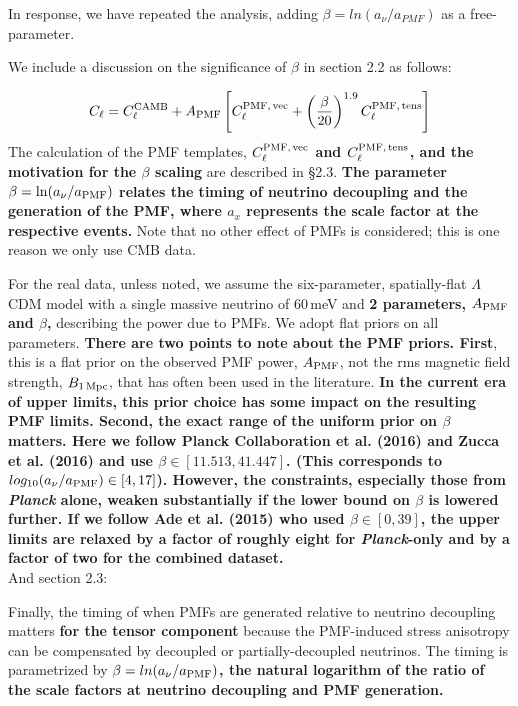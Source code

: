 \documentclass{article}
\newcommand{\cpmftens}{\ensuremath{C_{\ell}^{\rm PMF,\,tens}}}
\newcommand{\cpmfvec}{\ensuremath{C_{\ell}^{\rm PMF,\,vec}}}
\newcommand{\apmf}{\ensuremath{A_{\rm PMF}}}
\newcommand{\bpmf}{\ensuremath{B_{\rm 1\,Mpc}}}
\newcommand{\lcdm}{\ensuremath{\Lambda}CDM}
\newcommand{\be}{\begin{equation}}
\newcommand{\ee}{\end{equation}}
\newcommand{\planck}{{\sl Planck}}
\newcommand{\added}[1]{\textbf{#1}}
\newcommand{\diff}[1]{\textcolor{PineGreen}{#1}}
\begin{document}
In response, we have repeated the analysis, adding $\beta = ln(a_{\nu}/a_{PMF})$ as a free-parameter.

We include a discussion on the significance of $\beta$ in section 2.2 as follows:

\diff{
\be
C_\ell = C_\ell^{\rm{CAMB}} + \apmf \left[\cpmfvec + \left(\frac{\beta}{20}\right)^{1.9}  \cpmftens \right]
\ee
The calculation of the PMF templates,\added{ \cpmfvec{} and \cpmftens{}, and the motivation for the $\beta$ scaling} are described in \S 2.3. 
\added{The parameter $\beta = {\rm ln}(a_{\nu}/a_{\rm{PMF}})$ relates the timing of neutrino decoupling and the generation of the PMF, where $a_x$ represents the scale factor at the respective events.} Note that no other effect of  PMFs is considered; this is one reason we only use CMB data.}

\diff{For the real data, unless noted, we assume the six-parameter, spatially-flat \lcdm{} model with a single massive neutrino of 60\,meV and \added{2 parameters, \apmf{} and $\beta$, }describing the power due to PMFs.
We adopt flat priors on all parameters. 
\added{There are two points to note about the PMF priors. 
First}, this is a flat prior on the observed PMF power, $\apmf$, not the rms magnetic field strength, \bpmf, that has often been used in the literature. 
\added{In the current era of upper limits, this prior choice has some impact on the resulting PMF limits. 
Second, the exact range of the uniform prior on $\beta$ matters. 
Here we follow Planck Collaboration et al. (2016) and Zucca et al. (2016) and use $\beta \in [11.513, 41.447]$. (This corresponds to $log_{10} (a_{\nu}/a_{\rm{PMF}}) \in[4,17]$).
However, the constraints, especially those from \planck{} alone, weaken substantially if the lower bound on $\beta$ is lowered further. 
If we follow Ade et al. (2015) who used $\beta \in [0,39]$, the upper limits are relaxed by a factor of roughly eight for \planck-only and by a factor of two for the combined dataset.}}\\

And section 2.3:

\diff{Finally, the timing of when PMFs are generated relative to neutrino decoupling matters \added{for the tensor component} because the PMF-induced stress anisotropy can be compensated by decoupled or partially-decoupled neutrinos. 
The timing is parametrized by \added{$\beta = ln(a_{\nu}/a_{\rm{PMF}})$, the natural logarithm of the ratio of the scale factors at neutrino decoupling and PMF generation.}}
\end{document}
